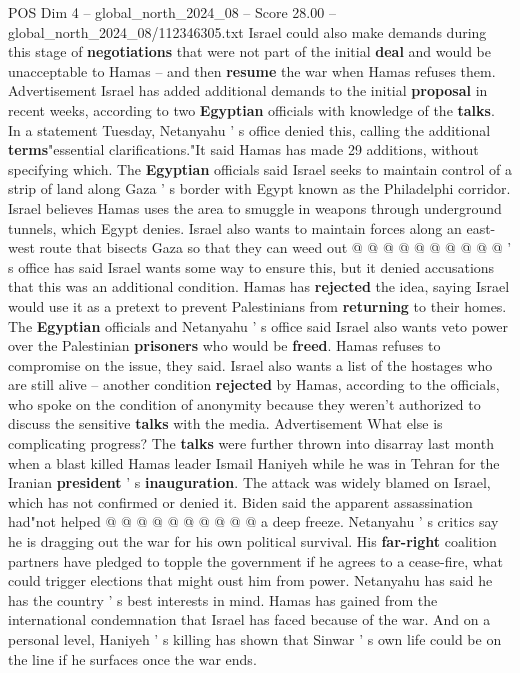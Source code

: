 \begin{textsample}{POS Dim 4 – global\_north\_2024\_08 – Score 28.00 – global\_north\_2024\_08/112346305.txt}
Israel could also make demands during this stage of \textbf{negotiations} that were not part of the initial \textbf{deal} and would be unacceptable to Hamas -- and then \textbf{resume} the war when Hamas refuses them.
Advertisement Israel has added additional demands to the initial \textbf{proposal} in recent weeks, according to two \textbf{Egyptian} officials with knowledge of the \textbf{talks}.
In a statement Tuesday, Netanyahu ' s office denied this, calling the additional \textbf{terms}"essential clarifications."It said Hamas has made 29 additions, without specifying which.
The \textbf{Egyptian} officials said Israel seeks to maintain control of a strip of land along Gaza ' s border with Egypt known as the Philadelphi corridor.
Israel believes Hamas uses the area to smuggle in weapons through underground tunnels, which Egypt denies.
Israel also wants to maintain forces along an east-west route that bisects Gaza so that they can weed out @ @ @ @ @ @ @ @ @ @ ' s office has said Israel wants some way to ensure this, but it denied accusations that this was an additional condition.
Hamas has \textbf{rejected} the idea, saying Israel would use it as a pretext to prevent Palestinians from \textbf{returning} to their homes.
The \textbf{Egyptian} officials and Netanyahu ' s office said Israel also wants veto power over the Palestinian \textbf{prisoners} who would be \textbf{freed}.
Hamas refuses to compromise on the issue, they said.
Israel also wants a list of the hostages who are still alive -- another condition \textbf{rejected} by Hamas, according to the officials, who spoke on the condition of anonymity because they weren't authorized to discuss the sensitive \textbf{talks} with the media.
Advertisement What else is complicating progress?
The \textbf{talks} were further thrown into disarray last month when a blast killed Hamas leader Ismail Haniyeh while he was in Tehran for the Iranian \textbf{president} ' s \textbf{inauguration}.
The attack was widely blamed on Israel, which has not confirmed or denied it.
Biden said the apparent assassination had"not helped @ @ @ @ @ @ @ @ @ @ a deep freeze.
Netanyahu ' s critics say he is dragging out the war for his own political survival.
His \textbf{far-right} coalition partners have pledged to topple the government if he agrees to a cease-fire, what could trigger elections that might oust him from power.
Netanyahu has said he has the country ' s best interests in mind.
Hamas has gained from the international condemnation that Israel has faced because of the war.
And on a personal level, Haniyeh ' s killing has shown that Sinwar ' s own life could be on the line if he surfaces once the war ends.

\end{textsample}
